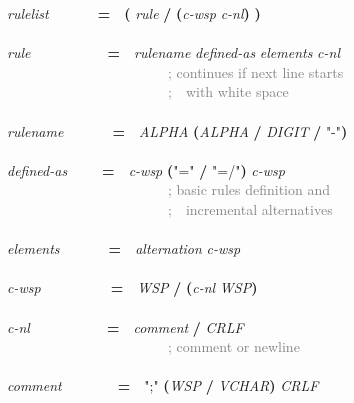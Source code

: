 \documentclass{article}
\renewcommand{\textsuperscript}[1]{\raisebox{0.8ex}{#1}}
\begin{document}
{\scriptsize\ttfamily
\emph{rulelist}\mbox{~~~~~~~}\textbf{=}\mbox{~~}\textcolor{teal}{\emph{\textsuperscript{1*}}}\textbf{(} \emph{rule} \textbf{/} \textbf{(}\textcolor{teal}{\emph{\textsuperscript{*}}}\emph{c-{}wsp} \emph{c-{}nl}\textbf{)} \textbf{)}\\
\\
\emph{rule}\mbox{~~~~~~~~~~~}\textbf{=}\mbox{~~}\emph{rulename} \emph{defined-{}as} \emph{elements} \emph{c-{}nl}\\
\mbox{~~~~~~~~~~~~~~~~~~~~~~~}\textcolor{gray}{; continues if next line starts}\\
\mbox{~~~~~~~~~~~~~~~~~~~~~~~}\textcolor{gray}{;\mbox{~~}with white space}\\
\\
\emph{rulename}\mbox{~~~~~~~}\textbf{=}\mbox{~~}\emph{ALPHA} \textcolor{teal}{\emph{\textsuperscript{*}}}\textbf{(}\emph{ALPHA} \textbf{/} \emph{DIGIT} \textbf{/} \textcolor{BrickRed}{"-{}"}\textbf{)}\\
\\
\emph{defined-{}as}\mbox{~~~~~}\textbf{=}\mbox{~~}\textcolor{teal}{\emph{\textsuperscript{*}}}\emph{c-{}wsp} \textbf{(}\textcolor{BrickRed}{"="} \textbf{/} \textcolor{BrickRed}{"=/"}\textbf{)} \textcolor{teal}{\emph{\textsuperscript{*}}}\emph{c-{}wsp}\\
\mbox{~~~~~~~~~~~~~~~~~~~~~~~}\textcolor{gray}{; basic rules definition and}\\
\mbox{~~~~~~~~~~~~~~~~~~~~~~~}\textcolor{gray}{;\mbox{~~}incremental alternatives}\\
\\
\emph{elements}\mbox{~~~~~~~}\textbf{=}\mbox{~~}\emph{alternation} \textcolor{teal}{\emph{\textsuperscript{*}}}\emph{c-{}wsp}\\
\\
\emph{c-{}wsp}\mbox{~~~~~~~~~~}\textbf{=}\mbox{~~}\emph{WSP} \textbf{/} \textbf{(}\emph{c-{}nl} \emph{WSP}\textbf{)}\\
\\
\emph{c-{}nl}\mbox{~~~~~~~~~~~}\textbf{=}\mbox{~~}\emph{comment} \textbf{/} \emph{CRLF}\\
\mbox{~~~~~~~~~~~~~~~~~~~~~~~}\textcolor{gray}{; comment or newline}\\
\\
\emph{comment}\mbox{~~~~~~~~}\textbf{=}\mbox{~~}\textcolor{BrickRed}{";"} \textcolor{teal}{\emph{\textsuperscript{*}}}\textbf{(}\emph{WSP} \textbf{/} \emph{VCHAR}\textbf{)} \emph{CRLF}\\
\\
}
\end{document}
